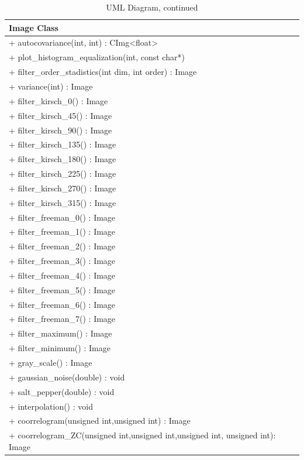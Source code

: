 \documentclass[a4paper]{article}
\begin{document}
\begin{table}[H]
	\label{UML2}
    \caption{UML Diagram, continued}
	\centering
    
	\begin{tabular}[15cm]{ 
    >{\arraybackslash}m{15cm}}
        \toprule 

		\large{Image Class} \\   

		\midrule
 		+ autocovariance(int, int) : CImg<float> \\
		+ plot\_histogram\_equalization(int, const char*) \\
        + filter\_order\_stadistics(int dim, int order) : Image \\
		+ variance(int) : Image \\
        + filter\_kirsch\_0() : Image \\
		+ filter\_kirsch\_45() : Image \\
        + filter\_kirsch\_90() : Image \\
        + filter\_kirsch\_135() : Image \\
        + filter\_kirsch\_180() : Image \\
        + filter\_kirsch\_225() : Image \\
        + filter\_kirsch\_270() : Image \\
        + filter\_kirsch\_315() : Image \\
        + filter\_freeman\_0() : Image \\
        + filter\_freeman\_1() : Image \\
        + filter\_freeman\_2() : Image \\
        + filter\_freeman\_3() : Image \\
        + filter\_freeman\_4() : Image \\
        + filter\_freeman\_5() : Image \\
        + filter\_freeman\_6() : Image \\
        + filter\_freeman\_7() : Image \\
        + filter\_maximum() : Image \\
        + filter\_minimum() : Image \\
        + gray\_scale() : Image \\
        + gaussian\_noise(double) : void \\
        + salt\_pepper(double) : void \\
        + interpolation() : void \\
		+ coorrelogram(unsigned int,unsigned int) : Image \\
		+ coorrelogram\_ZC(unsigned int,unsigned int,unsigned int, unsigned int): Image \\
        \bottomrule
        
 
	\end{tabular}
    
\end{table}
\end{document}
